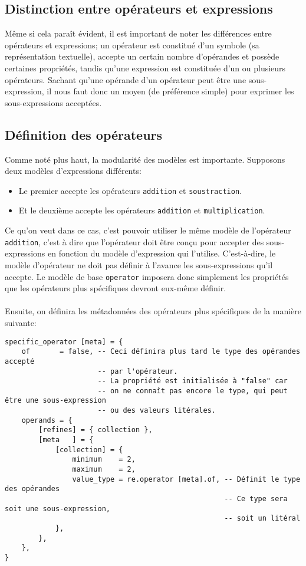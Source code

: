 \documentclass{article}
\begin{document}
\subsection{Distinction entre opérateurs et expressions}
Même si cela paraît évident, il est important de noter les différences entre opérateurs et expressions; un opérateur est constitué d'un symbole (sa représentation textuelle), accepte un certain nombre d'opérandes et possède certaines propriétés, tandis qu'une expression est constituée d'un ou plusieurs opérateurs. Sachant qu'une opérande d'un opérateur peut être une sous-expression, il nous faut donc un moyen (de préférence simple) pour exprimer les sous-expressions acceptées.

\subsection{Définition des opérateurs}
Comme noté plus haut, la modularité des modèles est importante. Supposons deux modèles d'expressions différents:

\begin{itemize}
	\item Le premier accepte les opérateurs \lstinline|addition| et \lstinline|soustraction|.
	\item Et le deuxième accepte les opérateurs \lstinline|addition| et \lstinline|multiplication|.
\end{itemize}

\noindent Ce qu'on veut dans ce cas, c'est pouvoir utiliser le même modèle de l'opérateur \lstinline|addition|, c'est à dire que l'opérateur doit être conçu pour accepter des sous-expressions en fonction du modèle d'expression qui l'utilise. C'est-à-dire, le modèle d'opérateur ne doit pas définir à l'avance les sous-expressions qu'il accepte. Le modèle de base \lstinline|operator| imposera donc simplement les propriétés que les opérateurs plus spécifiques devront eux-même définir. \\
\ \\
Ensuite, on définira les métadonnées des opérateurs plus spécifiques de la manière suivante:
\begin{verbatim}
specific_operator [meta] = {
	of       = false, -- Ceci définira plus tard le type des opérandes accepté
	                  -- par l'opérateur.
	                  -- La propriété est initialisée à "false" car 
	                  -- on ne connaît pas encore le type, qui peut être une sous-expression
	                  -- ou des valeurs litérales.
	operands = {
		[refines] = { collection },
		[meta   ] = {
			[collection] = {
				minimum    = 2,
				maximum    = 2,
				value_type = re.operator [meta].of, -- Définit le type des opérandes
				                                    -- Ce type sera soit une sous-expression, 
				                                    -- soit un litéral
			},
		},
	},
}
\end{verbatim}
\end{document}
